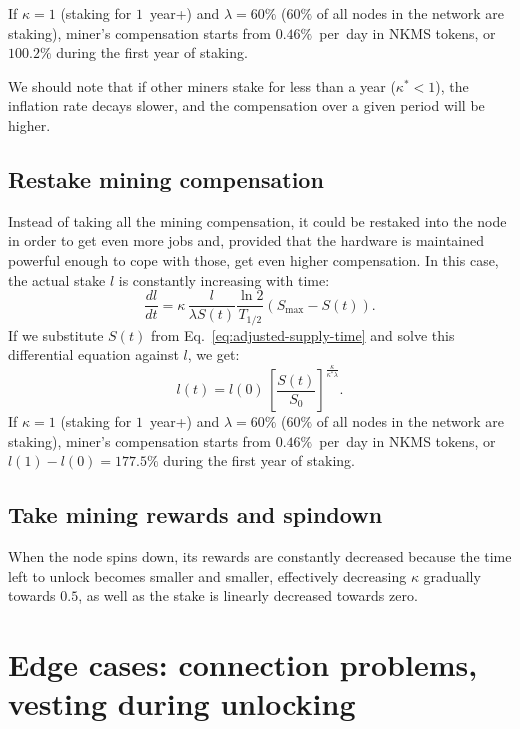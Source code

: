 \documentclass[longbibliography,nofootinbib,twocolumn]{revtex4-1}
\begin{document}
If $\kappa=1$ (staking for $1$~year+) and $\lambda=60\%$ ($60\%$ of all nodes in the network are staking),
miner's compensation starts from $0.46\%$~per~day in NKMS tokens,
or $100.2\%$ during the first year of staking.

We should note that if other miners stake for less than a year ($\kappa^* < 1$), the inflation rate decays slower, and the compensation over a given period
will be higher.

\subsection{Restake mining compensation}

Instead of taking all the mining compensation, it could be restaked into the node in order to get even more jobs and, provided that the hardware is maintained
powerful enough to cope with those, get even higher compensation.
In this case, the actual stake $l$ is constantly increasing with time:
\begin{equation}
    \frac{dl}{dt} =  \kappa\, \frac{l}{\lambda S(t)} \frac{\ln{2}}{T_{1/2}} \left( S_{\max} - S(t)\right).
\end{equation}
If we substitute $S(t)$ from Eq.~\ref{eq:adjusted-supply-time} and solve this differential equation against $l$, we get:
\begin{equation}
    l(t) = l(0)\,\left[ \frac{S(t)}{S_0} \right]^{\frac{\kappa}{\kappa^* \lambda}}.
\end{equation}
If $\kappa=1$ (staking for $1$~year+) and $\lambda=60\%$ ($60\%$ of all nodes in the network are staking),
miner's compensation starts from $0.46\%$~per~day in NKMS tokens,
or $l(1) - l(0) = 177.5\%$ during the first year of staking.

\subsection{Take mining rewards and spindown}

When the node spins down, its rewards are constantly decreased because the time left to unlock becomes smaller and smaller,
effectively decreasing $\kappa$ gradually towards $0.5$,
as well as the stake is linearly decreased towards zero.

\section{Edge cases: connection problems, vesting during unlocking}
\end{document}
